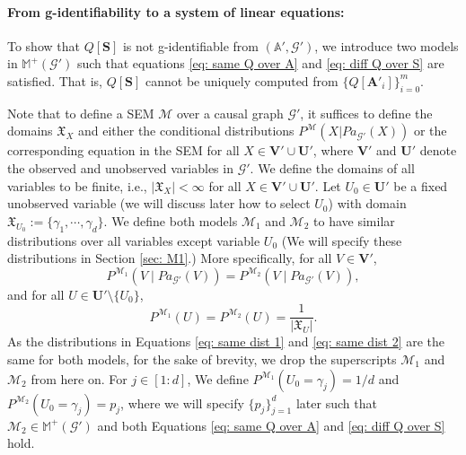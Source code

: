 \documentclass[accepted]{uai2022}
\newcommand{\Pa}[2]{\textit{Pa}_{#2}(#1)}
\newcommand{\V}[0]{\mathbf{V}}
\newcommand{\U}[0]{\mathbf{U}}
\newcommand{\A}[0]{\mathbf{A}}
\newcommand{\G}[0]{\mathcal{G}}
\newcommand{\M}[0]{\mathcal{M}}
\newcommand{\dom}[1]{\mathfrak{X}_{#1}}
\begin{document}
    \paragraph{From g-identifiability to a system of linear equations:}\label{sec: linearequations}
    To show  that $Q[\mathbf{S}]$ is not g-identifiable from $(\mathbb{A}', \G')$, we introduce two models in $\mathbb{M^+(\G')}$ such that equations \eqref{eq: same Q over A} and \eqref{eq: diff Q over S} are satisfied. 
    That is, $Q[\mathbf{S}]$ cannot be uniquely computed from $\{Q[\A'_i]\}_{i=0}^m$.
    
    Note that to define a SEM $\M$ over a causal graph $\G'$, it suffices to define the domains $\dom{X}$ and either the conditional distributions $P^{\M}(X|\Pa{X}{\G'})$ or the corresponding equation in the SEM for all  $X\in \V'\cup \U'$, where $\V'$ and $\U'$ denote the observed and unobserved variables in $\G'$. 
    We define the domains of all variables to be finite, i.e., $|\dom{X}|<\infty$ for all $X\in\V'\cup \U'$.
    Let $U_0 \in \U'$ be a fixed unobserved variable (we will discuss later how to select $U_0$) with domain $\dom{U_0} := \{\gamma_1,\cdots,\gamma_d\}$.
    We define both models $\M_1$ and $\M_2$ to have similar distributions over all variables except variable $U_0$ (We will specify these distributions in Section \ref{sec: M1}.)
    More specifically, for all $V \in \V'$,
    \begin{equation} \label{eq: same dist 1}
        P^{\M_1}(V \mid \Pa{V}{\G'}) = P^{\M_2}(V \mid \Pa{V}{\G'}),
    \end{equation}
    and for all $U \in \U' \setminus \{U_0\}$,
    \begin{equation} \label{eq: same dist 2}
        P^{\M_1}(U) = P^{\M_2}(U)=\frac{1}{|\dom{U}|}.
    \end{equation}
    As the distributions in Equations \eqref{eq: same dist 1} and \eqref{eq: same dist 2} are the same for both models, for the sake of brevity, we drop the superscripts $\M_1$ and $\M_2$ from here on.
    For $j\in[1:d]$, We define $P^{\M_1}(U_0=\gamma_j)=1/d$ and $P^{\M_2}(U_0 = \gamma_j)=p_j$, where we will specify $\{p_j\}_{j=1}^d$ later such that $\M_2\in\mathbb{M}^+(\G')$ and both Equations \eqref{eq: same Q over A} and \eqref{eq: diff Q over S} hold.
    
\end{document}
